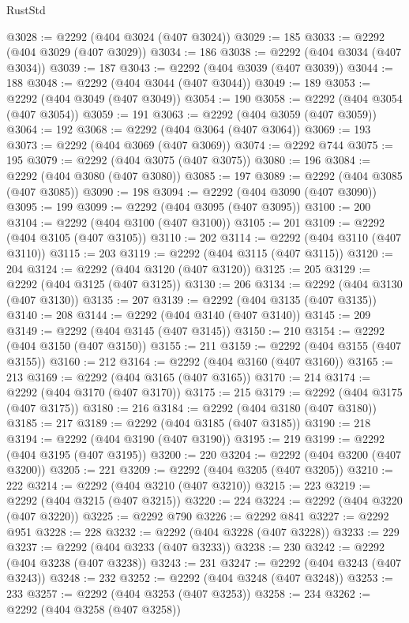 \begin{lexlean}{RustStd}
\begin{coremodule}
@3028 := @2292 (@404 @3024 (@407 @3024))
@3029 := 185
@3033 := @2292 (@404 @3029 (@407 @3029))
@3034 := 186
@3038 := @2292 (@404 @3034 (@407 @3034))
@3039 := 187
@3043 := @2292 (@404 @3039 (@407 @3039))
@3044 := 188
@3048 := @2292 (@404 @3044 (@407 @3044))
@3049 := 189
@3053 := @2292 (@404 @3049 (@407 @3049))
@3054 := 190
@3058 := @2292 (@404 @3054 (@407 @3054))
@3059 := 191
@3063 := @2292 (@404 @3059 (@407 @3059))
@3064 := 192
@3068 := @2292 (@404 @3064 (@407 @3064))
@3069 := 193
@3073 := @2292 (@404 @3069 (@407 @3069))
@3074 := @2292 @744
@3075 := 195
@3079 := @2292 (@404 @3075 (@407 @3075))
@3080 := 196
@3084 := @2292 (@404 @3080 (@407 @3080))
@3085 := 197
@3089 := @2292 (@404 @3085 (@407 @3085))
@3090 := 198
@3094 := @2292 (@404 @3090 (@407 @3090))
@3095 := 199
@3099 := @2292 (@404 @3095 (@407 @3095))
@3100 := 200
@3104 := @2292 (@404 @3100 (@407 @3100))
@3105 := 201
@3109 := @2292 (@404 @3105 (@407 @3105))
@3110 := 202
@3114 := @2292 (@404 @3110 (@407 @3110))
@3115 := 203
@3119 := @2292 (@404 @3115 (@407 @3115))
@3120 := 204
@3124 := @2292 (@404 @3120 (@407 @3120))
@3125 := 205
@3129 := @2292 (@404 @3125 (@407 @3125))
@3130 := 206
@3134 := @2292 (@404 @3130 (@407 @3130))
@3135 := 207
@3139 := @2292 (@404 @3135 (@407 @3135))
@3140 := 208
@3144 := @2292 (@404 @3140 (@407 @3140))
@3145 := 209
@3149 := @2292 (@404 @3145 (@407 @3145))
@3150 := 210
@3154 := @2292 (@404 @3150 (@407 @3150))
@3155 := 211
@3159 := @2292 (@404 @3155 (@407 @3155))
@3160 := 212
@3164 := @2292 (@404 @3160 (@407 @3160))
@3165 := 213
@3169 := @2292 (@404 @3165 (@407 @3165))
@3170 := 214
@3174 := @2292 (@404 @3170 (@407 @3170))
@3175 := 215
@3179 := @2292 (@404 @3175 (@407 @3175))
@3180 := 216
@3184 := @2292 (@404 @3180 (@407 @3180))
@3185 := 217
@3189 := @2292 (@404 @3185 (@407 @3185))
@3190 := 218
@3194 := @2292 (@404 @3190 (@407 @3190))
@3195 := 219
@3199 := @2292 (@404 @3195 (@407 @3195))
@3200 := 220
@3204 := @2292 (@404 @3200 (@407 @3200))
@3205 := 221
@3209 := @2292 (@404 @3205 (@407 @3205))
@3210 := 222
@3214 := @2292 (@404 @3210 (@407 @3210))
@3215 := 223
@3219 := @2292 (@404 @3215 (@407 @3215))
@3220 := 224
@3224 := @2292 (@404 @3220 (@407 @3220))
@3225 := @2292 @790
@3226 := @2292 @841
@3227 := @2292 @951
@3228 := 228
@3232 := @2292 (@404 @3228 (@407 @3228))
@3233 := 229
@3237 := @2292 (@404 @3233 (@407 @3233))
@3238 := 230
@3242 := @2292 (@404 @3238 (@407 @3238))
@3243 := 231
@3247 := @2292 (@404 @3243 (@407 @3243))
@3248 := 232
@3252 := @2292 (@404 @3248 (@407 @3248))
@3253 := 233
@3257 := @2292 (@404 @3253 (@407 @3253))
@3258 := 234
@3262 := @2292 (@404 @3258 (@407 @3258))

\end{coremodule}
\end{lexlean}
